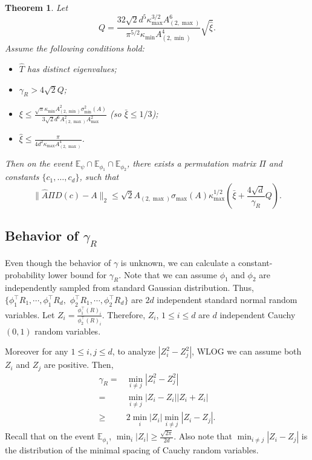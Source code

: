 \documentclass[twoside]{article}
\newcommand{\Ephione}{\mathbb{E}_{\phi_1}}
\newcommand{\Ephitwo}{\mathbb{E}_{\phi_2}}
\newcommand{\Epsi}{\mathbb{E}_{\psi}}
\newtheorem{thm}[lemma]{Theorem}
\theoremstyle{definition}
\begin{document}
\begin{thm}
\label{thm:Modefficiency}
Let 
 \[ 
 Q=  \frac{32\sqrt{2}d^5\kappa^{3/2}_{\max}A^6_{(2,\max)}}{\pi^{5/2}\kappa_{\min}A^4_{(2,\min)}} \sqrt{\widehat{\xi}}.
 \] 
 Assume the following conditions hold:
 \begin{itemize}
 \item $\widehat{T}$ has distinct eigenvalues;
 \item $\gamma_R > 4\sqrt{2}Q$;
 \item $\xi \le \frac{\sqrt{\pi}\kappa_{\min}A^2_{(2,\min)}\sigma_{\min}^2(A)}{3\sqrt{2}d^6A_{(2,\max)}^2A_{\max}^2}$ (so $\bar{\xi} \le 1/3$);
 \item $\widehat{\xi} \le \frac{\pi}{4d^2\kappa_{\max}A^4_{(2,\max)}}$.
 \end{itemize}
Then on the event $\Epsi \cap \Ephione \cap \Ephitwo$, there exists a permutation matrix $\Pi$ and constants $\{c_1,\ldots,c_d\}$, such that 
\[
\|\widehat{A}\Pi D(c) - A\|_2 
\le 
\sqrt{2} A_{(2,\max)}\sigma_{\max}(A)\kappa_{\max}^{1/2} \left( \bar{\xi} + \frac{4\sqrt{d}}{\gamma_R}Q\right). 
\]
\end{thm}
\subsection{Behavior of $\gamma_R$}
\label{subsec:gammaR}
Even though the behavior of $\gamma$ is unknown, we can calculate a constant-probability lower bound for $\gamma_R$. 
Note that we can assume $\phi_1$ and $\phi_2$ are independently sampled from standard Gaussian distribution. 
Thus, $\{\phi_1^{\top}R_1, \cdots, \phi_1^{\top}R_d,$ $\phi_2^{\top}R_1, \cdots, \phi_2^{\top}R_d\}$ are $2d$ independent standard normal random variables. 
Let $Z_i = \frac{\phi_1^{\top}(R)_i}{\phi_2^{\top}(R)_i}$. Therefore, $Z_i$, $1\le i\le d$ are $d$ independent Cauchy$(0,1)$ random variables. 

Moreover for any $1\le i, j \le d$, to analyze $\left\vert Z_i^2 - Z_j^2\right\vert
$, WLOG we can assume both $Z_i$ and $Z_j$ are positive. Then, 
\begin{align*}
\gamma_R =	& \min_{i\neq j} \left\vert Z_i^2 - Z_j^2 \right\vert \\
	=		& \min_{i\neq j}\left\vert Z_i - Z_i \right\vert	\left\vert Z_i + Z_i \right\vert \\
	\ge 	& 2\min_i\vert Z_i\vert\min_{i\neq j} \left\vert Z_i - Z_j \right\vert.
\end{align*}
Recall that on the event $\Ephione$, $\min_i\vert Z_i \vert \ge \frac{\sqrt{2\pi}}{2d}$. 
Also note that $\min_{i\neq j} \left\vert Z_i - Z_j \right\vert$ is the distribution of the minimal spacing of Cauchy random variables.
\end{document}
